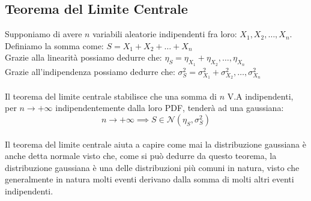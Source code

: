 \documentclass{article}
\begin{document}
\subsection{Teorema del Limite Centrale}
Supponiamo di avere $n$ variabili aleatorie indipendenti fra loro: $X_1, X_2, \dots, X_n$. \\
Definiamo la somma come: $S = X_1 + X_2+  \dots + X_n$ \\
Grazie alla linearità possiamo dedurre che: $\eta_S = \eta_{X_1} + \eta_{X_2}, \dots, \eta_{X_n}$ \\
Grazie all'indipendenza possiamo dedurre che: $\sigma_S^2 = \sigma_{X_1}^2 + \sigma_{X_2}^2, \dots, \sigma_{X_n}^2$ \\ \\
Il teorema del limite centrale stabilisce che una somma di $n$ V.A indipendenti, per $n \to +\infty$ indipendentemente dalla loro PDF, tenderà ad una gaussiana: 
\[n \to +\infty \implies S \in \mathcal{N}\left( \eta_S, \sigma_S^2 \right)\]
\\ Il teorema del limite centrale aiuta a capire come mai la distribuzione gaussiana è anche detta normale visto che, come si può dedurre da questo teorema, la distribuzione gaussiana è una delle distribuzioni più comuni in natura, visto che generalmente in natura molti eventi derivano dalla somma di molti altri eventi indipendenti.
\end{document}
